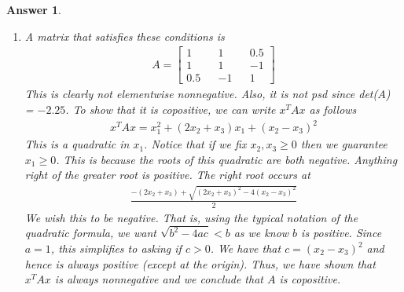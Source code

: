 \documentclass[12pt]{article}
\theoremstyle{colon}
\newtheorem*{answer}{Answer}
\begin{document}
\begin{answer}
\begin{enumerate}[label=\alph*)]
\begin{gather*}
\begin{bmatrix}
          0 && 0
        \end{bmatrix}
      \end{gather*}
      Which is vacuously copositive. Hence, noncopositive matrices are not convex when $n \geq 2$. However, when $n = 1$, then noncopositive means that the numbers belong to $\mathbb{R}_{< 0}$ (since $x^T A x = A x^2$ in one dimension). Thus, picking $a, b \in \mathbb{R}_{< 0}$ and $\lambda \in (0,1)$ results in
      \begin{gather*}
        x (\lambda a + (1-\lambda)b) x = \lambda a x^2 + (1-\lambda) b x^2 < 0
      \end{gather*}
      Which is negative because both terms have exactly one negative term.

    \item A matrix that satisfies these conditions is
      \begin{gather*}
        A = \begin{bmatrix}
          1 && 1 && 0.5 \\
          1 && 1 && -1 \\
          0.5 && -1 && 1
        \end{bmatrix}
      \end{gather*}
      This is clearly not elementwise nonnegative. Also, it is not psd since det($A$) = $-2.25$. To show that it is copositive, we can write $x^T A x$ as follows
      \begin{gather*}
        x^T A x = x_1^2 + (2 x_2 + x_3) x_1 + (x_2 - x_3)^2
      \end{gather*}
      This is a quadratic in $x_1$. Notice that if we fix $x_2, x_3 \geq 0$ then we guarantee $x_1 \geq 0$. This is because the roots of this quadratic are both negative. Anything right of the greater root is positive. The right root occurs at
      \begin{gather*}
        \frac{-(2 x_2 + x_3) +  \sqrt{(2 x_2 + x_3)^2 - 4 (x_2 - x_3)^2}}{2}
      \end{gather*}
      We wish this to be negative. That is, using the typical notation of the quadratic formula, we want $\sqrt{b^2 - 4ac} < b$ as we know $b$ is positive. Since $a = 1$, this simplifies to asking if $c > 0$. We have that $c = (x_2 - x_3)^2$ and hence is always positive (except at the origin). Thus, we have shown that $x^T A x$ is always nonnegative and we conclude that $A$ is copositive.
  \end{enumerate}
\end{answer}
\end{document}
